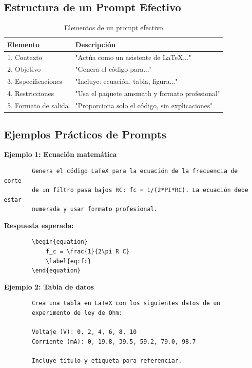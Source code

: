 \documentclass[11pt,letterpaper]{article}
\begin{document}
\subsection{Estructura de un Prompt Efectivo}

\begin{table}[H]
	\centering
	\begin{tabular}{@{}p{}p{}@{}}
		\toprule
		\textbf{Elemento} & \textbf{Descripción} \\
		\midrule
		1. Contexto & "Actúa como un asistente de \LaTeX..." \\
		2. Objetivo & "Genera el código para..." \\
		3. Especificaciones & "Incluye: ecuación, tabla, figura..." \\
		4. Restricciones & "Usa el paquete amsmath y formato profesional" \\
		5. Formato de salida & "Proporciona solo el código, sin explicaciones" \\
		\bottomrule
	\end{tabular}
	\caption{Elementos de un prompt efectivo}
	\label{tab:prompt}
\end{table}

\subsection{Ejemplos Prácticos de Prompts}

\begin{cajaejemplo}
	\textbf{Ejemplo 1: Ecuación matemática}
	\begin{verbatim}
		Genera el código LaTeX para la ecuación de la frecuencia de corte 
		de un filtro pasa bajos RC: fc = 1/(2*PI*RC). La ecuación debe estar 
		numerada y usar formato profesional.
	\end{verbatim}
	
	\textbf{Respuesta esperada:}
	\begin{lstlisting}
		\begin{equation}
			f_c = \frac{1}{2\pi R C}
			\label{eq:fc}
		\end{equation}
	\end{lstlisting}
\end{cajaejemplo}

\begin{cajaejemplo}
	\textbf{Ejemplo 2: Tabla de datos}
	\begin{verbatim}
		Crea una tabla en LaTeX con los siguientes datos de un 
		experimento de ley de Ohm:
		
		Voltaje (V): 0, 2, 4, 6, 8, 10
		Corriente (mA): 0, 19.8, 39.5, 59.2, 79.0, 98.7
		
		Incluye título y etiqueta para referenciar.
	\end{verbatim}
\end{cajaejemplo}
\end{document}
